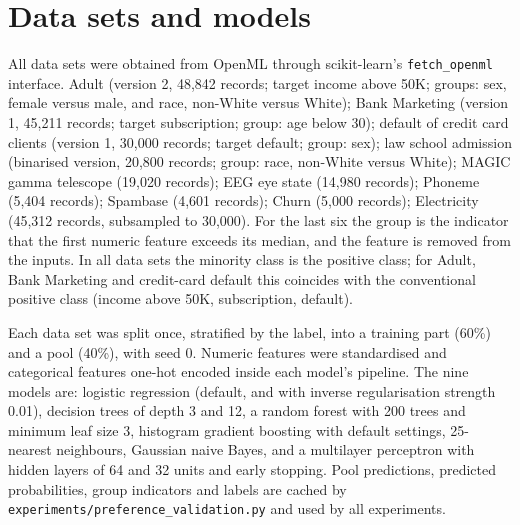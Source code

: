 \section{Data sets and models}\label{app:data}

All data sets were obtained from OpenML through scikit-learn's \texttt{fetch\_openml} interface. Adult (version 2, 48,842 records; target income above 50K; groups: sex, female versus male, and race, non-White versus White); Bank Marketing (version 1, 45,211 records; target subscription; group: age below 30); default of credit card clients (version 1, 30,000 records; target default; group: sex); law school admission (binarised version, 20,800 records; group: race, non-White versus White); MAGIC gamma telescope (19,020 records); EEG eye state (14,980 records); Phoneme (5,404 records); Spambase (4,601 records); Churn (5,000 records); Electricity (45,312 records, subsampled to 30,000). For the last six the group is the indicator that the first numeric feature exceeds its median, and the feature is removed from the inputs. In all data sets the minority class is the positive class; for Adult, Bank Marketing and credit-card default this coincides with the conventional positive class (income above 50K, subscription, default).

Each data set was split once, stratified by the label, into a training part (60\%) and a pool (40\%), with seed 0. Numeric features were standardised and categorical features one-hot encoded inside each model's pipeline. The nine models are: logistic regression (default, and with inverse regularisation strength 0.01), decision trees of depth 3 and 12, a random forest with 200 trees and minimum leaf size 3, histogram gradient boosting with default settings, 25-nearest neighbours, Gaussian naive Bayes, and a multilayer perceptron with hidden layers of 64 and 32 units and early stopping. Pool predictions, predicted probabilities, group indicators and labels are cached by \texttt{experiments/preference\_validation.py} and used by all experiments.
